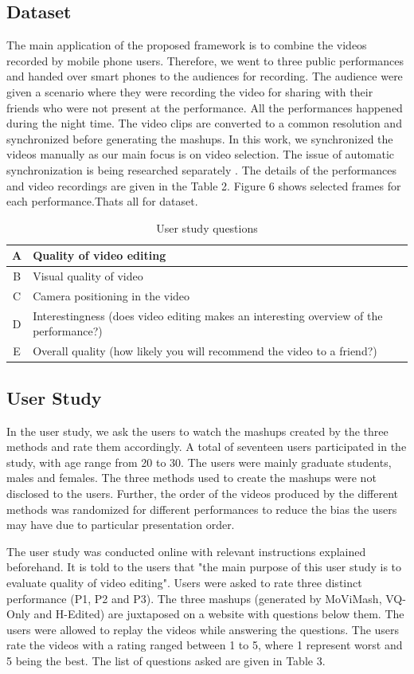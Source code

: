 \documentclass{sig-alternate-05-2015}
\begin{document}
\subsection{Dataset}
The main application of the proposed framework is to combine
the videos recorded by mobile phone users. Therefore, we went to
three public performances and handed over smart phones to the audiences for recording. The audience were given a scenario where
they were recording the video for sharing with their friends who
were not present at the performance. All the performances happened during the night time. The video clips are converted to a
common resolution and synchronized before generating the mashups.
In this work, we synchronized the videos manually as our main focus is on video selection. The issue of automatic synchronization is
being researched separately \cite{14}. The details of the performances
and video recordings are given in the Table 2. Figure 6 shows selected frames for each performance.Thats all for dataset.
\begin{table}
\centering
\caption{User study questions}
\begin{tabular}{c|L{6.5cm}}\hline
A & Quality of video editing \\ \hline
B & Visual quality of video \\ \hline
C & Camera positioning in the video\\\hline
D & Interestingness (does video editing makes an interesting overview of the performance?)\\\hline
E & Overall quality (how likely you will recommend the video to
a friend?) \\\hline
\end{tabular}
\end{table}


\subsection{User Study}
In the user study, we ask the users to watch the mashups created
by the three methods and rate them accordingly. A total of seventeen users participated in the study, with age range from 20 to 30.
The users were mainly graduate students, males and females. The
three methods used to create the mashups were not disclosed to the
users. Further, the order of the videos produced by the different
methods was randomized for different performances to reduce the
bias the users may have due to particular presentation order.

The user study was conducted online with relevant instructions
explained beforehand. It is told to the users that "the main purpose
of this user study is to evaluate quality of video editing". Users
were asked to rate three distinct performance (P1, P2 and P3). The
three mashups (generated by MoViMash, VQ-Only and H-Edited)
are juxtaposed on a website with questions below them. The users 
were allowed to replay the videos while answering the questions.
The users rate the videos with a rating ranged between 1 to 5, where
1 represent worst and 5 being the best. The list of questions asked
are given in Table 3.
\end{document}
